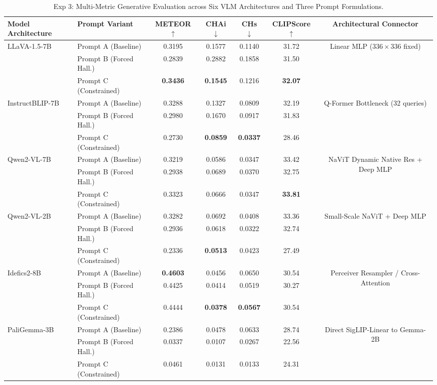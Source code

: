 \documentclass[conference]{IEEEtran}
\begin{document}
\begin{table}[t]
\caption{Exp 3: Multi-Metric Generative Evaluation across Six VLM Architectures and Three Prompt Formulations.}
\label{tab:exp3_models}
\centering
\begin{tabularx}{\textwidth}{llccccc}
\toprule
\textbf{Model Architecture} & \textbf{Prompt Variant} & \textbf{METEOR} $\uparrow$ & \textbf{CHAi} $\downarrow$ & \textbf{CHs} $\downarrow$ & \textbf{CLIPScore} $\uparrow$ & \textbf{Architectural Connector} \\
\midrule
\multirow{3}{*}{LLaVA-1.5-7B} 
 & Prompt A (Baseline)     & 0.3195 & 0.1577 & 0.1140 & 31.72 & \multirow{3}{*}{Linear MLP ($336\times 336$ fixed)} \\
 & Prompt B (Forced Hall.) & 0.2839 & 0.2882 & 0.1858 & 31.50 & \\
 & Prompt C (Constrained)  & \textbf{0.3436} & \textbf{0.1545} & 0.1216 & \textbf{32.07} & \\
\midrule
\multirow{3}{*}{InstructBLIP-7B} 
 & Prompt A (Baseline)     & 0.3288 & 0.1327 & 0.0809 & 32.19 & \multirow{3}{*}{Q-Former Bottleneck (32 queries)} \\
 & Prompt B (Forced Hall.) & 0.2980 & 0.1670 & 0.0917 & 31.83 & \\
 & Prompt C (Constrained)  & 0.2730 & \textbf{0.0859} & \textbf{0.0337} & 28.46 & \\
\midrule
\multirow{3}{*}{Qwen2-VL-7B} 
 & Prompt A (Baseline)     & 0.3219 & 0.0586 & 0.0347 & 33.42 & \multirow{3}{*}{NaViT Dynamic Native Res + Deep MLP} \\
 & Prompt B (Forced Hall.) & 0.2938 & 0.0689 & 0.0370 & 32.75 & \\
 & Prompt C (Constrained)  & 0.3323 & 0.0666 & 0.0347 & \textbf{33.81} & \\
\midrule
\multirow{3}{*}{Qwen2-VL-2B} 
 & Prompt A (Baseline)     & 0.3282 & 0.0692 & 0.0408 & 33.36 & \multirow{3}{*}{Small-Scale NaViT + Deep MLP} \\
 & Prompt B (Forced Hall.) & 0.2936 & 0.0618 & 0.0322 & 32.74 & \\
 & Prompt C (Constrained)  & 0.2336 & \textbf{0.0513} & 0.0423 & 27.49 & \\
\midrule
\multirow{3}{*}{Idefics2-8B} 
 & Prompt A (Baseline)     & \textbf{0.4603} & 0.0456 & 0.0650 & 30.54 & \multirow{3}{*}{Perceiver Resampler / Cross-Attention} \\
 & Prompt B (Forced Hall.) & 0.4425 & 0.0414 & 0.0519 & 30.27 & \\
 & Prompt C (Constrained)  & 0.4444 & \textbf{0.0378} & \textbf{0.0567} & 30.54 & \\
\midrule
\multirow{3}{*}{PaliGemma-3B} 
 & Prompt A (Baseline)     & 0.2386 & 0.0478 & 0.0633 & 28.74 & \multirow{3}{*}{Direct SigLIP-Linear to Gemma-2B} \\
 & Prompt B (Forced Hall.) & 0.0337 & 0.0107 & 0.0267 & 22.56 & \\
 & Prompt C (Constrained)  & 0.0461 & 0.0131 & 0.0133 & 24.31 & \\
\bottomrule
\end{tabularx}
\end{table}
\end{document}
